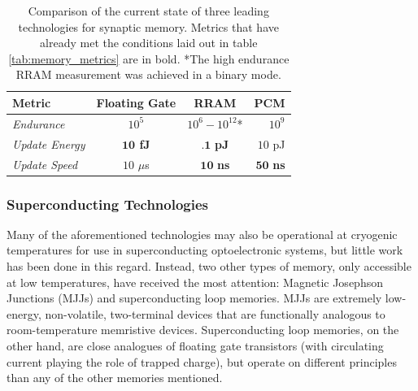 \documentclass[twocolumn]{article}
\begin{document}
\begin{table}[h!]
  \begin{center}
    \label{tab:memory_comparison}
    \begin{tabular}{l|c|c|r} %
      \textbf{Metric} & \textbf{Floating Gate} & \textbf{RRAM} &\textbf{PCM} \\
      \hline
      \textit{Endurance} & $10^{5}$ & $10^{6}-10^{12}$* & $10^{9}$  \\
      \textit{Update Energy} & \textbf{$\textbf{10}$ fJ} & $\textbf{.1}$ \textbf{pJ} & $10$ pJ\\
      \textit{Update Speed} & $10$ $\mu$s  & $\textbf{10}$ \textbf{ns} & $\textbf{50}$ \textbf{ns}\\
    \end{tabular}
    \caption{Comparison of the current state of three leading technologies for synaptic memory. Metrics that have already met the conditions laid out in table \ref{tab:memory_metrics} are in bold. *The high endurance RRAM measurement was achieved in a binary mode.}
  \end{center}
\end{table}

\subsubsection{Superconducting Technologies}
Many of the aforementioned technologies may also be operational at cryogenic temperatures for use in superconducting optoelectronic systems, but little work has been done in this regard. Instead, two other types of memory, only accessible at low temperatures, have received the most attention: Magnetic Josephson Junctions (MJJs) and superconducting loop memories. MJJs are extremely low-energy, non-volatile, two-terminal devices that are functionally analogous to room-temperature memristive devices. Superconducting loop memories, on the other hand, are close analogues of floating gate transistors (with circulating current playing the role of trapped charge), but operate on different principles than any of the other memories mentioned.
\end{document}
